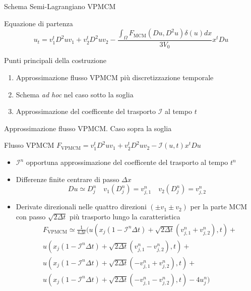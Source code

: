 \begin{frame}{Schema Semi-Lagrangiano VPMCM}
  \begin{block}{Equazione di partenza}
    \[
    u_t=v_1^tD^2uv_1+v_2^tD^2uv_2 - \frac{\int_{\Omega}F_{\text{MCM}}(Du,D^2u)\delta(u)dx}{3V_0}x^tDu
    \]
  \end{block}
  \begin{block}{Punti principali della costruzione}
    \begin{enumerate}
    \item Approssimazione flusso VPMCM più discretizzazione temporale
    \item Schema \emph{ad hoc} nel caso sotto la soglia
    \item Approssimazione del coefficente del trasporto $\mathcal{I}$
      al tempo $t$ 
    \end{enumerate}
  \end{block}
\end{frame}
 
\begin{frame}{Approssimazione flusso VPMCM. Caso sopra la soglia}
  \begin{alertblock}{Flusso VPMCM}
    $F_{\text{VPMCM}}=v_1^tD^2uv_1+v_2^tD^2uv_2 -
    \mathcal{I}(u,t)x^tDu$
    \end{alertblock}
  \begin{itemize}
    \item $\mathcal{I}^n$ opportuna approssimazione del coefficente
      del trasporto al  tempo $t^n$
    \item Differenze finite centrare di passo $\Delta x$ 
      \[
      Du\simeq D_j^n\quad v_1(D_j^n)=v_{j,1}^n\quad v_2(D_j^n)=v_{j,2}^n
      \]
    \item Derivate direzionali nelle \alert{quattro} direzioni $(\pm
      v_1\pm v_2)$ per la parte MCM con passo $\sqrt{2\Delta t}$ più
      trasporto lungo la caratteristica
      \[
      \begin{aligned}
        &F_{\text{VPMCM}}\simeq\frac{1}{4\Delta
          t}(u(x_j(1-\mathcal{I}^n\Delta t)+\sqrt{2\Delta
          t}(v_{j,1}^n+v_{j,2}^n),t)+ \\
        &u(x_j(1-\mathcal{I}^n\Delta t)+\sqrt{2\Delta
          t}(v_{j,1}^n-v_{j,2}^n),t)+\\
        &u(x_j(1-\mathcal{I}^n\Delta t)+\sqrt{2\Delta
          t}(-v_{j,1}^n+v_{j,2}^n),t)+\\
        &u(x_j(1-\mathcal{I}^n\Delta t)+\sqrt{2\Delta
          t}(-v_{j,1}^n-v_{j,2}^n),t)-4u_j^n)
      \end{aligned}
      \]
  \end{itemize}
\end{frame}

